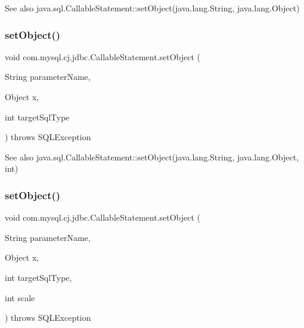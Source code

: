 \begin{DoxySeeAlso}{See also}
java.\+sql.\+Callable\+Statement\+::set\+Object(java.\+lang.\+String, java.\+lang.\+Object) 
\end{DoxySeeAlso}
\mbox{\label{classcom_1_1mysql_1_1cj_1_1jdbc_1_1_callable_statement_a43a0be416f90c7c642fc33122bbccfb1}} 
\subsubsection{\texorpdfstring{set\+Object()}{setObject()}\hspace{0.1cm}{\footnotesize\ttfamily [2/3]}}
{\footnotesize\ttfamily void com.\+mysql.\+cj.\+jdbc.\+Callable\+Statement.\+set\+Object (\begin{DoxyParamCaption}\item[{String}]{parameter\+Name,  }\item[{Object}]{x,  }\item[{int}]{target\+Sql\+Type }\end{DoxyParamCaption}) throws S\+Q\+L\+Exception}

\begin{DoxySeeAlso}{See also}
java.\+sql.\+Callable\+Statement\+::set\+Object(java.\+lang.\+String, java.\+lang.\+Object, int) 
\end{DoxySeeAlso}
\mbox{\label{classcom_1_1mysql_1_1cj_1_1jdbc_1_1_callable_statement_a5b8dc26448026aec39c4e87831d1e045}} 
\subsubsection{\texorpdfstring{set\+Object()}{setObject()}\hspace{0.1cm}{\footnotesize\ttfamily [3/3]}}
{\footnotesize\ttfamily void com.\+mysql.\+cj.\+jdbc.\+Callable\+Statement.\+set\+Object (\begin{DoxyParamCaption}\item[{String}]{parameter\+Name,  }\item[{Object}]{x,  }\item[{int}]{target\+Sql\+Type,  }\item[{int}]{scale }\end{DoxyParamCaption}) throws S\+Q\+L\+Exception}

